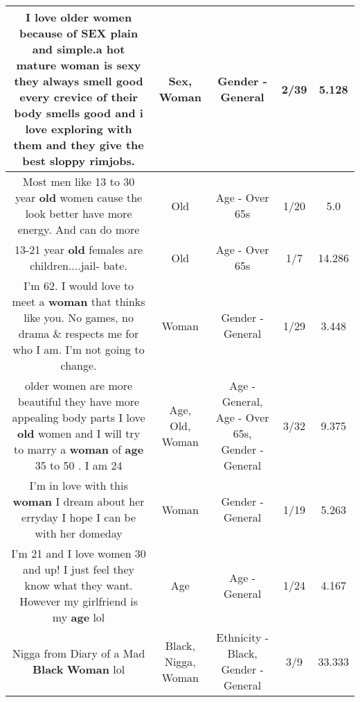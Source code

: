 \documentclass[11pt]{article}
\newlength\mylength
\begin{document}
\begin{center}
\begin{longtable}{|C{.65\mylength}|C{.30\mylength}|C{.12\mylength}|C{.12\mylength}|C{.12\mylength}|}
  \small I love older women because of \textbf{SEX} plain and simple.a hot mature \textbf{woman} is sexy they always smell good every crevice of their body smells good and i love exploring with them and they give the best sloppy rimjobs.\normalsize   & Sex, Woman & Gender - General & 2/39 & 5.128 \\  \hline
  \small Most men like 13 to 30 year \textbf{old} women cause the look better have more energy. And can do more\normalsize   & Old & Age - Over 65s & 1/20 & 5.0 \\  \hline
  \small 13-21 year \textbf{old} females are children....jail- bate.\normalsize   & Old & Age - Over 65s & 1/7 & 14.286 \\  \hline
  \small I'm 62. I would love to meet a \textbf{woman} that thinks like you. No games, no drama \& respects me for who I am. I'm not going to change.\normalsize   & Woman & Gender - General & 1/29 & 3.448 \\  \hline
  \small older women are more beautiful they have more appealing body parts I love \textbf{old} women and I will try to marry a \textbf{woman} of \textbf{age} 35 to 50 . I am 24\normalsize   & Age, Old, Woman & Age - General, Age - Over 65s, Gender - General & 3/32 & 9.375 \\  \hline
  \small I'm in love with this \textbf{woman} I dream about her erryday I hope I can be with her domeday\normalsize   & Woman & Gender - General & 1/19 & 5.263 \\  \hline
  \small I'm 21 and I love women 30 and up! I just feel they know what they want. However my girlfriend is my \textbf{age} lol\normalsize   & Age & Age - General & 1/24 & 4.167 \\  \hline
  \small Nigga from Diary of a Mad \textbf{Black} \textbf{Woman} lol\normalsize   & Black, Nigga, Woman & Ethnicity - Black, Gender - General & 3/9 & 33.333 \\  \hline

\end{longtable}
\end{center}
\end{document}
